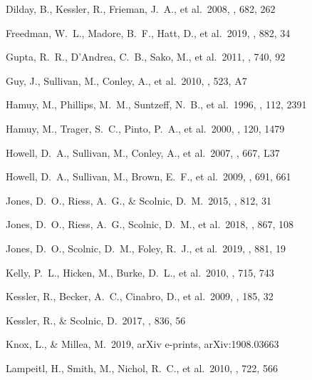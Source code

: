 \documentclass[]{aa} %
\begin{document}
\begin{thebibliography}{}
 Dilday, B., Kessler, R., Frieman, J.~A., et al.\ 2008, \apj, 682, 262


 Freedman, W.~L., Madore, B.~F., Hatt, D., et al.\ 2019, \apj, 882, 34

 Gupta, R.~R., D'Andrea, C.~B., Sako, M., et al.\ 2011, \apj, 740, 92

 Guy, J., Sullivan, M., Conley, A., et al.\ 2010, \aap, 523, A7


 Hamuy, M., Phillips, M.~M., Suntzeff, N.~B., et al.\ 1996, \aj, 112, 2391

 Hamuy, M., Trager, S.~C., Pinto, P.~A., et al.\ 2000, \aj, 120, 1479

 Howell, D.~A., Sullivan, M., Conley, A., et al.\ 2007, \apjl, 667, L37

 Howell, D.~A., Sullivan, M., Brown, E.~F., et al.\ 2009, \apj, 691, 661

 Jones, D.~O., Riess, A.~G., \& Scolnic, D.~M.\ 2015, \apj, 812, 31

 Jones, D.~O., Riess, A.~G., Scolnic, D.~M., et al.\ 2018, \apj, 867, 108

 Jones, D.~O., Scolnic, D.~M., Foley, R.~J., et al.\ 2019, \apj, 881, 19

 Kelly, P.~L., Hicken, M., Burke, D.~L., et al.\ 2010, \apj, 715, 743

 Kessler, R., Becker, A.~C., Cinabro, D., et al.\ 2009, \apjs, 185, 32

 Kessler, R., \& Scolnic, D.\ 2017, \apj, 836, 56

 Knox, L., \& Millea, M.\ 2019, arXiv e-prints, arXiv:1908.03663

 Lampeitl, H., Smith, M., Nichol, R.~C., et al.\ 2010, \apj, 722, 566


\end{thebibliography}
\end{document}
